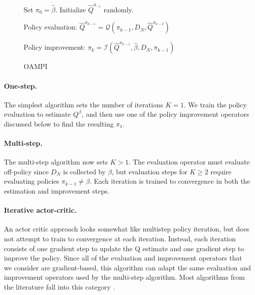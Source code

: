 \begin{figure}[h]
\vspace{-0.5cm}
\begin{algorithm}[H]
    \caption{OAMPI}
    \label{alg:oapi}
    \begin{algorithmic}[1]

             \State Set $\pi_0 = \hat \beta$. Initialize $ \widehat Q^{\pi_{-1}}$ randomly.

             \State Policy evaluation: $ \widehat Q^{\pi_{k-1}} = \mathcal{Q}(\pi_{k-1}, D_N, \widehat Q^{\pi_{k-2}})$

             \State Policy improvement: $ \pi_{k} = \mathcal{I}(\widehat Q^{\pi_{k-1}}, \hat \beta, D_N, \pi_{k-1})$
             \EndFor
        \end{algorithmic}
    \end{algorithm}
\end{figure}



\paragraph{One-step.}
The simplest algorithm sets the number of iterations $ K = 1$. We train the policy evaluation to estimate $ Q^\beta$, and then use one of the policy improvement operators discussed below to find the resulting $ \pi_1$.


\paragraph{Multi-step.}
The multi-step algorithm now sets $ K >1$. The evaluation operator must evaluate off-policy since $ D_N$ is collected by $ \beta$, but evaluation steps for $ K \geq 2$ require evaluating policies $ \pi_{k-1}\neq \beta$. Each iteration is trained to convergence in both the estimation and improvement steps.

\paragraph{Iterative actor-critic.}

An actor critic approach looks somewhat like multistep policy iteration, but does not attempt to train to convergence at each iteration. Instead, each iteration consists of one gradient step to update the Q estimate and one gradient step to improve the policy. Since all of the evaluation and improvement operators that we consider are gradient-based, this algorithm can adapt the same evaluation and improvement operators used by the multi-step algorithm. Most algorithms from the literature fall into this category \citep{fujimoto2018off, kumar2019stabilizing, kumar2020conservative, wu2019behavior,  wang2020critic, Siegel2020Keep}.


